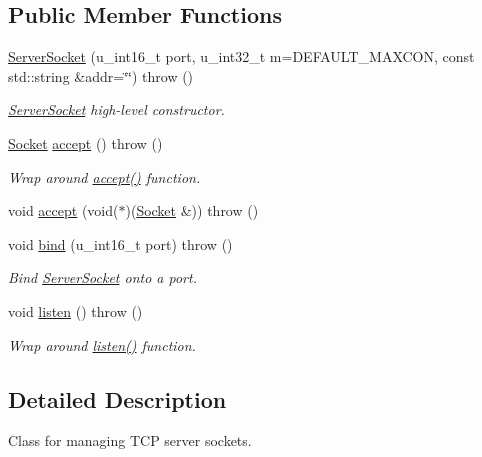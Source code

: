 \subsection*{Public Member Functions}
\begin{CompactItemize}
\item 
\hyperlink{classusock_1_1ServerSocket_0ac1908d4a4afb675715ae0ad994e870}{ServerSocket} (u\_\-int16\_\-t port, u\_\-int32\_\-t m=DEFAULT\_\-MAXCON, const std::string \&addr=\char`\"{}\char`\"{})  throw ()
\begin{CompactList}\small\item\em \hyperlink{classusock_1_1ServerSocket}{ServerSocket} high-level constructor. \item\end{CompactList}\item 
\hyperlink{classusock_1_1Socket}{Socket} \hyperlink{classusock_1_1ServerSocket_bf0477af52a725ced6afad86d7b3e794}{accept} ()  throw ()
\begin{CompactList}\small\item\em Wrap around \hyperlink{classusock_1_1ServerSocket_bf0477af52a725ced6afad86d7b3e794}{accept()} function. \item\end{CompactList}\item 
void \hyperlink{classusock_1_1ServerSocket_99fb8624c4eb79fbed48059f3c7ddfca}{accept} (void($\ast$)(\hyperlink{classusock_1_1Socket}{Socket} \&))  throw ()
\item 
void \hyperlink{classusock_1_1ServerSocket_9ecf37cae8379df6eaf366ab88df244a}{bind} (u\_\-int16\_\-t port)  throw ()
\begin{CompactList}\small\item\em Bind \hyperlink{classusock_1_1ServerSocket}{ServerSocket} onto a port. \item\end{CompactList}\item 
void \hyperlink{classusock_1_1ServerSocket_c6cd2070380b84275c5f69265c57713b}{listen} ()  throw ()
\begin{CompactList}\small\item\em Wrap around \hyperlink{classusock_1_1ServerSocket_c6cd2070380b84275c5f69265c57713b}{listen()} function. \item\end{CompactList}\end{CompactItemize}


\subsection{Detailed Description}
Class for managing TCP server sockets. 


